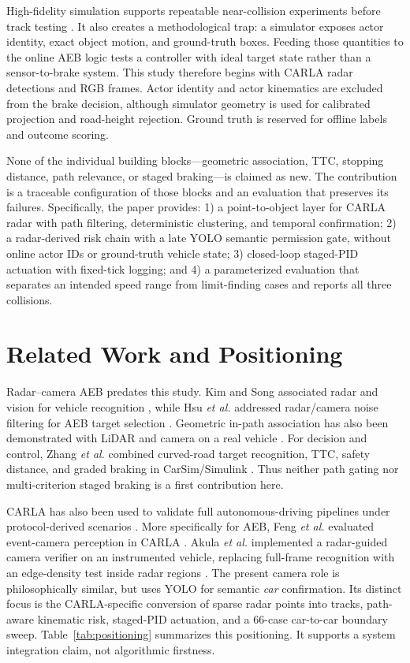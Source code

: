 \documentclass[conference]{IEEEtran}
\begin{document}
High-fidelity simulation supports repeatable near-collision experiments before
track testing \cite{dosovitskiy2017carla,kang2019testing}. It also creates a
methodological trap: a simulator exposes actor identity, exact object motion,
and ground-truth boxes. Feeding those quantities to the online AEB logic tests a
controller with ideal target state rather than a sensor-to-brake system. This
study therefore begins with CARLA radar detections and RGB frames. Actor identity
and actor kinematics are excluded from the brake decision, although simulator
geometry is used for calibrated projection and road-height rejection. Ground
truth is reserved for offline labels and outcome scoring.

None of the individual building blocks---geometric association, TTC, stopping
distance, path relevance, or staged braking---is claimed as new. The contribution
is a traceable configuration of those blocks and an evaluation that preserves
its failures. Specifically, the paper provides: 1) a point-to-object layer for
CARLA radar with path filtering, deterministic clustering, and temporal
confirmation; 2) a radar-derived risk chain with a late YOLO semantic permission
gate, without online actor IDs or ground-truth vehicle state; 3) closed-loop
staged-PID actuation with fixed-tick logging; and 4) a parameterized evaluation
that separates an intended speed range from limit-finding cases and reports all
three collisions.

\section{Related Work and Positioning}
Radar--camera AEB predates this study. Kim and Song associated radar and vision
for vehicle recognition \cite{kim2013vehicle}, while Hsu \emph{et al.} addressed
radar/camera noise filtering for AEB target selection \cite{hsu2015noise}.
Geometric in-path association has also been demonstrated with LiDAR and camera
on a real vehicle \cite{bae2021cipv}. For decision and control, Zhang \emph{et
al.} combined curved-road target recognition, TTC, safety distance, and graded
braking in CarSim/Simulink \cite{zhang2023curved}. Thus neither path gating nor
multi-criterion staged braking is a first contribution here.

CARLA has also been used to validate full autonomous-driving pipelines under
protocol-derived scenarios \cite{gomez2022carla}. More specifically for AEB,
Feng \emph{et al.} evaluated event-camera perception in CARLA
\cite{feng2025dvs}. Akula \emph{et al.} implemented a radar-guided camera
verifier on an instrumented vehicle, replacing full-frame recognition with an
edge-density test inside radar regions \cite{akula2026radarguided}. The present
camera role is philosophically similar, but uses YOLO for semantic \emph{car}
confirmation. Its distinct focus is the CARLA-specific conversion of sparse
radar points into tracks, path-aware kinematic risk, staged-PID actuation, and a
66-case car-to-car boundary sweep. Table~\ref{tab:positioning} summarizes this
positioning. It supports a system integration claim, not algorithmic firstness.
\end{document}
